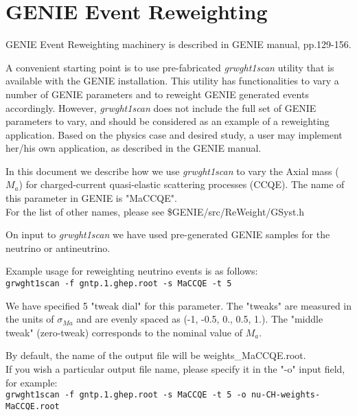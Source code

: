 \section{GENIE Event Reweighting}

GENIE Event Reweighting machinery is described in GENIE manual\cite{geniemanual}, pp.129-156.

A convenient starting point is to use pre-fabricated {\it grwght1scan} utility that is available with 
the GENIE installation. This utility has functionalities to vary a number of GENIE parameters and to reweight
GENIE generated events accordingly.
However, {\it grwght1scan} does not include the full set of GENIE parameters to vary, and should be considered 
as an example of a reweighting application.
Based on the physics case and desired study, a user may implement her/his own application, as described 
in the GENIE manual\cite{geniemanual}.

In this document we describe how we use {\it grwght1scan} to vary the Axial mass ($M_{a}$) for charged-current 
quasi-elastic scattering processes (CCQE). The name of this parameter in GENIE is "MaCCQE".\\
For the list of other names, please see \$GENIE/src/ReWeight/GSyst.h 

On input to {\it grwght1scan} we have used pre-generated GENIE samples for the neutrino or antineutrino.

Example usage for reweighting neutrino events is as follows: \\
{\tt grwght1scan -f gntp.1.ghep.root -s MaCCQE -t 5}

We have specified 5 "tweak dial" for this parameter. The "tweaks" are measured in the units of $\sigma_{Ma}$
and are evenly spaced  as (-1, -0.5, 0., 0.5, 1.).
The "middle tweak" (zero-tweak) corresponds to the nominal value of $M_{a}$.

By default, the name of the output file will be weights\_MaCCQE.root. \\
If you wish a particular output file name, please specify it in the "-o" input field, for example: \\
{\tt grwght1scan -f gntp.1.ghep.root -s MaCCQE -t 5 -o nu-CH-weights-MaCCQE.root }

